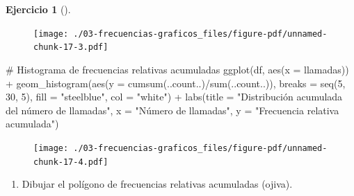 \documentclass[
  a4paper,
]{scrreport}
\newenvironment{Shaded}{\begin{snugshade}}{\end{snugshade}}
\newcommand{\AttributeTok}[1]{\textcolor[rgb]{0.40,0.45,0.13}{#1}}
\newcommand{\CommentTok}[1]{\textcolor[rgb]{0.37,0.37,0.37}{#1}}
\newcommand{\DecValTok}[1]{\textcolor[rgb]{0.68,0.00,0.00}{#1}}
\newcommand{\FunctionTok}[1]{\textcolor[rgb]{0.28,0.35,0.67}{#1}}
\newcommand{\NormalTok}[1]{\textcolor[rgb]{0.00,0.23,0.31}{#1}}
\newcommand{\SpecialCharTok}[1]{\textcolor[rgb]{0.37,0.37,0.37}{#1}}
\newcommand{\StringTok}[1]{\textcolor[rgb]{0.13,0.47,0.30}{#1}}
\providecommand{\tightlist}{%
  \setlength{\itemsep}{0pt}\setlength{\parskip}{0pt}}\usepackage{longtable,booktabs,array}
\theoremstyle{definition}
\newtheorem{exercise}{Ejercicio}[chapter]
\theoremstyle{remark}
\begin{document}
\begin{exercise}[]
\begin{tcolorbox}
\begin{figure}[H]

{\centering \texttt{[image: ./03-frecuencias-graficos\_files/figure-pdf/unnamed-chunk-17-3.pdf]}

}

\end{figure}

\begin{Shaded}
\begin{Highlighting}[]
\CommentTok{\# Histograma de frecuencias relativas acumuladas}
\FunctionTok{ggplot}\NormalTok{(df, }\FunctionTok{aes}\NormalTok{(}\AttributeTok{x =}\NormalTok{ llamadas)) }\SpecialCharTok{+}
    \FunctionTok{geom\_histogram}\NormalTok{(}\FunctionTok{aes}\NormalTok{(}\AttributeTok{y =} \FunctionTok{cumsum}\NormalTok{(..count..)}\SpecialCharTok{/}\FunctionTok{sum}\NormalTok{(..count..)),  }\AttributeTok{breaks =} \FunctionTok{seq}\NormalTok{(}\DecValTok{5}\NormalTok{, }\DecValTok{30}\NormalTok{, }\DecValTok{5}\NormalTok{), }\AttributeTok{fill =} \StringTok{"steelblue"}\NormalTok{, }\AttributeTok{col =} \StringTok{"white"}\NormalTok{) }\SpecialCharTok{+}
    \FunctionTok{labs}\NormalTok{(}\AttributeTok{title =} \StringTok{"Distribución acumulada del número de llamadas"}\NormalTok{, }\AttributeTok{x =} \StringTok{"Número de llamadas"}\NormalTok{, }\AttributeTok{y =} \StringTok{"Frecuencia relativa acumulada"}\NormalTok{)}
\end{Highlighting}
\end{Shaded}

\begin{figure}[H]

{\centering \texttt{[image: ./03-frecuencias-graficos\_files/figure-pdf/unnamed-chunk-17-4.pdf]}

}

\end{figure}

\end{tcolorbox}

\begin{enumerate}
\def\labelenumi{\alph{enumi}.}
\setcounter{enumi}{4}
\tightlist
\item
  Dibujar el polígono de frecuencias relativas acumuladas (ojiva).
\end{enumerate}

\begin{tcolorbox}[enhanced jigsaw, rightrule=.15mm, toptitle=1mm, colbacktitle=quarto-callout-tip-color!10!white, titlerule=0mm, colback=white, leftrule=.75mm, bottomtitle=1mm, colframe=quarto-callout-tip-color-frame, breakable, title=\textcolor{quarto-callout-tip-color}{\faLightbulb}\hspace{0.5em}{Solución 1}, arc=.35mm, coltitle=black, opacityback=0, bottomrule=.15mm, opacitybacktitle=0.6, left=2mm, toprule=.15mm]


\end{tcolorbox}
\end{exercise}
\end{document}
